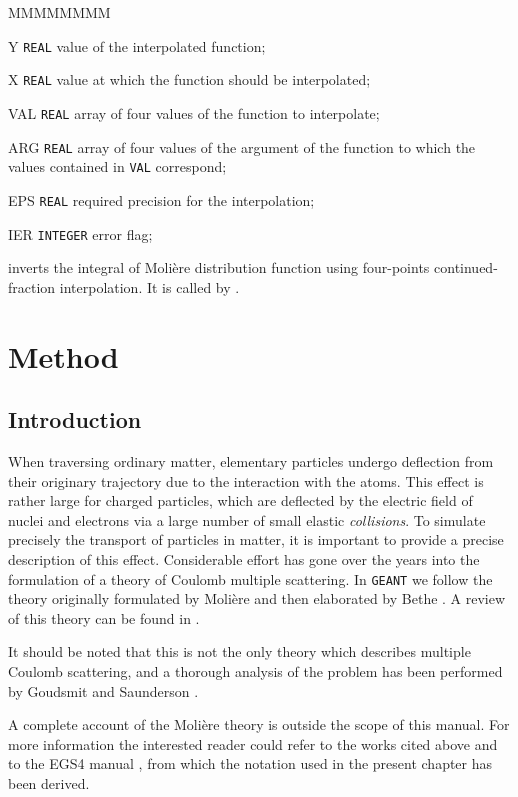 \begin{DLtt}{MMMMMMMM}
\item[Y] {\tt REAL} value of the interpolated function;
\item[X] {\tt REAL} value at which the function should be interpolated;
\item[VAL] {\tt REAL} array of four values of the function to
interpolate;
\item[ARG] {\tt REAL} array of four values of the argument of the
function to which the values contained in {\tt VAL} correspond;
\item[EPS]  {\tt REAL} required precision for the interpolation;
\item[IER] {\tt INTEGER} error flag;
\end{DLtt}
 inverts the integral of Moli\`ere distribution
function using four-points continued-fraction interpolation.
It is called by .

\section{Method} 
\subsection{Introduction}
When traversing ordinary matter, elementary particles undergo deflection
from their originary trajectory due to the interaction with the atoms.
This effect is rather large for charged particles, which are deflected
by the electric field of nuclei and electrons via a large number of 
small elastic {\it collisions}. To simulate precisely the transport of
particles in matter, it is important to provide a precise description 
of this effect. Considerable effort has gone over the years into
the formulation of a theory of Coulomb multiple scattering. In 
{\tt GEANT} we follow the theory originally formulated by Moli\`{e}re
\cite{bib-MOLI} \cite{bib-MOL1} and then elaborated by Bethe 
\cite{bib-BET1}. A review of this theory can be found in \cite{bib-SCOT}.

It should be noted that this is not the only theory which describes
multiple Coulomb scattering, and a thorough analysis of the problem has
been performed by Goudsmit and Saunderson \cite{bib-GOUD} \cite{bib-GOU1}.

A complete account of the Moli\`{e}re theory is outside the scope of this
manual. For more information the interested reader could refer to the
works cited above and to the EGS4 manual
\cite{bib-EGS4}, from which the notation used in the present chapter
has been derived. 

